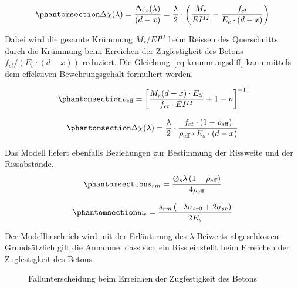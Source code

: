 \documentclass[
  12pt,
  letterpaper,
  egregdoesnotlikesansseriftitles]{scrreprt}
\begin{document}
\begin{equation}\phantomsection\label{eq-krummungsdiff}{
\Delta \chi(\lambda) = \frac{\Delta \varepsilon_s (\lambda)}{(d-x)} = \frac{\lambda}{2} \cdot \left ( \frac{M_r}{EI^{II}} - \frac{f_{ct}}{E_c\cdot(d-x)}\right )
}\end{equation}

Dabei wird die gesamte Krümmung \(M_r/EI^{II}\) beim Reissen des
Querschnitts durch die Krümmung beim Erreichen der Zugfestigkeit des
Betons \(f_{ct}/(E_c\cdot(d-x))\) reduziert. Die
Gleichung~\ref{eq-krummungsdiff} kann mittels dem effektiven
Bewehrungsgehalt formuliert werden.

\begin{equation}\phantomsection\label{eq-rho_eff}{
\rho_{\text{eff}} = \left [\frac{M_r(d-x)\cdot E_S}{f_{ct}\cdot EI^{II}}+1-n \right ]^{-1}
}\end{equation}

\begin{equation}\phantomsection\label{eq-krummungsdiff_2}{
\Delta \chi(\lambda) = \frac{\lambda}{2} \cdot \frac{f_{ct} \cdot (1-\rho_{\text{eff}})}{\rho_{\text{eff}} \cdot E_s \cdot (d-x)}
}\end{equation}

Das Modell liefert ebenfalls Beziehungen zur Bestimmung der Rissweite
und der Rissabstände.
\begin{equation}\phantomsection\label{eq-rissabstand_marti}{
s_{rm} = \frac{\oslash_{s} \lambda \left(1 - \rho_{\text{eff}}\right)}{4 \rho_{\text{eff}}}
}\end{equation}

\begin{equation}\phantomsection\label{eq-rissweite_marti}{
w_{r} = \frac{s_{rm} \left(- \lambda \sigma_{sr0} + 2 \sigma_{sr}\right)}{2 E_{s}}
}\end{equation}

Der Modellbeschrieb wird mit der Erläuterung des \(\lambda\)-Beiwerts
abgeschlossen. Grundsätzlich gilt die Annahme, dass sich ein Riss
einstellt beim Erreichen der Zugfestigkeit des Betons.

\begin{figure}[H]


\caption{\label{fig-fallunterscheidung_lambda_riss}Fallunterscheidung
beim Erreichen der Zugfestigkeit des Betons}

\end{figure}%
\end{document}

